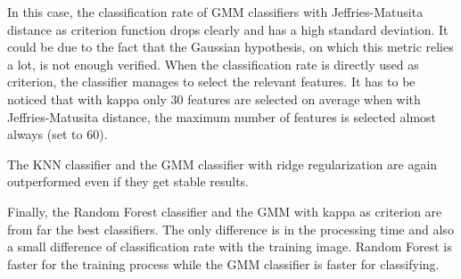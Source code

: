 \documentclass[journal,peerreview,onecolumn]{IEEEtran}
\begin{document}
    \begin{table}[!t]
        \centering
        \caption{Results of classification with 50000 samples by class and 5 trials (standard deviation in parenthesis).\label{tab:potsdam-otbsimu-big}}
    \end{table}

    In this case, the classification rate of GMM classifiers with Jeffries-Matusita distance as criterion function drops clearly and has a high standard deviation. It could be due to the fact that the Gaussian hypothesis, on which this metric relies a lot, is not enough verified. When the classification rate is directly used as criterion, the classifier manages to select the relevant features. It has to be noticed that with kappa only 30 features are selected on average when with Jeffries-Matusita distance, the maximum number of features is selected almost always (set to 60).

    The KNN classifier and the GMM classifier with ridge regularization are again outperformed even if they get stable results.

    Finally, the Random Forest classifier and the GMM with kappa as criterion are from far the best classifiers. The only difference is in the processing time and also a small difference of classification rate with the training image. Random Forest is faster for the training process while the GMM classifier is faster for classifying.
\end{document}

